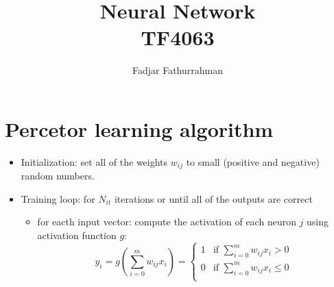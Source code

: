 \documentclass[a4paper,11pt]{article} %
\begin{document}
\title{Neural Network\\
TF4063}
\author{Fadjar Fathurrahman}
\date{}
\maketitle

\section{Percetor learning algorithm}

\begin{itemize}
\item Initialization: set all of the weights $w_{ij}$ to small (positive and negative) random numbers.
\item Training loop: for $N_{it}$ iterations or until all of the outputs are correct
  \begin{itemize}
  \item for eacth input vector: compute the activation of each neuron $j$ using activation
  function $g$:
  \begin{equation}
  y_{i} = g\left( \sum_{i=0}^{m} w_{ij} x_{i} \right) =
  \begin{cases}
  1 & \text{if } \sum_{i=0}^{m} w_{ij} x_{i} > 0 \\
  0 & \text{if } \sum_{i=0}^{m} w_{ij} x_{i} \leq 0 \\
  \end{cases}
  \end{equation}
  \end{itemize}
\end{itemize}



\end{document}
